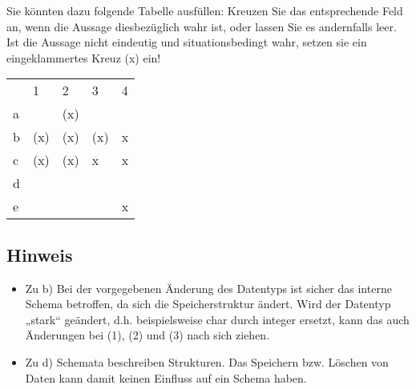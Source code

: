\documentclass{lehramt-informatik-aufgabe}
\begin{document}
\noindent
Sie könnten dazu folgende Tabelle ausfüllen: Kreuzen Sie das
entsprechende Feld an, wenn die Aussage diesbezüglich wahr ist, oder
lassen Sie es andernfalls leer. Ist die Aussage nicht eindeutig und
situationsbedingt wahr, setzen sie ein eingeklammertes Kreuz (x) ein!

\begin{liAntwort}
\begin{tabular}{lllll}
  &  1  &  2  & 3   & 4 \\
a &     & (x) &     &   \\
b & (x) & (x) & (x) & x \\
c & (x) & (x) &  x  & x \\
d &     &     &     &   \\
e &     &     &     & x
\end{tabular}

\subsection{Hinweis}

\begin{itemize}
\item Zu b) Bei der vorgegebenen Änderung des Datentyps ist sicher das
interne Schema betroffen, da sich die Speicherstruktur ändert. Wird der
Datentyp „stark“ geändert, d.h. beispielsweise char durch integer
ersetzt, kann das auch Änderungen bei (1), (2) und (3) nach sich ziehen.

\item Zu d) Schemata beschreiben Strukturen. Das Speichern bzw. Löschen
von Daten kann damit keinen Einfluss auf ein Schema haben.
\end{itemize}

\end{liAntwort}
\end{document}
